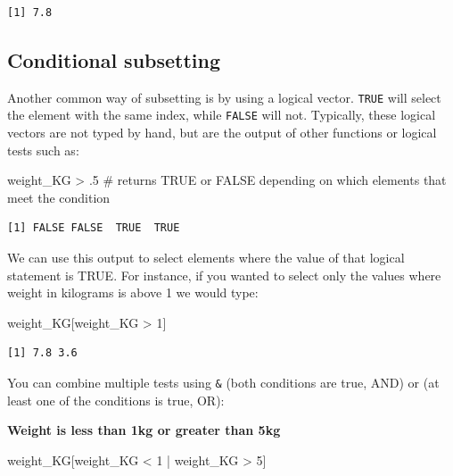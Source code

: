 \documentclass[
  letterpaper,
  DIV=11,
  numbers=noendperiod,
  oneside]{scrreprt}
\newenvironment{Shaded}{\begin{snugshade}}{\end{snugshade}}
\newcommand{\CommentTok}[1]{\textcolor[rgb]{0.37,0.37,0.37}{#1}}
\newcommand{\DecValTok}[1]{\textcolor[rgb]{0.68,0.00,0.00}{#1}}
\newcommand{\NormalTok}[1]{\textcolor[rgb]{0.00,0.23,0.31}{#1}}
\newcommand{\SpecialCharTok}[1]{\textcolor[rgb]{0.37,0.37,0.37}{#1}}
\begin{document}
\begin{verbatim}
[1] 7.8
\end{verbatim}

\subsection{Conditional subsetting}\label{sec-cond_subset}

Another common way of subsetting is by using a logical vector.
\texttt{TRUE} will select the element with the same index, while
\texttt{FALSE} will not. Typically, these logical vectors are not typed
by hand, but are the output of other functions or logical tests such as:

\begin{Shaded}
\begin{Highlighting}[]
\NormalTok{weight\_KG }\SpecialCharTok{\textgreater{}}\NormalTok{ .}\DecValTok{5}  \CommentTok{\# returns TRUE or FALSE depending on which elements that meet the condition}
\end{Highlighting}
\end{Shaded}

\begin{verbatim}
[1] FALSE FALSE  TRUE  TRUE
\end{verbatim}

We can use this output to select elements where the value of that
logical statement is TRUE. For instance, if you wanted to select only
the values where weight in kilograms is above 1 we would type:

\begin{Shaded}
\begin{Highlighting}[]
\NormalTok{weight\_KG[weight\_KG }\SpecialCharTok{\textgreater{}} \DecValTok{1}\NormalTok{]}
\end{Highlighting}
\end{Shaded}

\begin{verbatim}
[1] 7.8 3.6
\end{verbatim}

You can combine multiple tests using \texttt{\&} (both conditions are
true, AND) or \texttt{\textbar{}} (at least one of the conditions is
true, OR):

\textbf{Weight is less than 1kg or greater than 5kg}

\begin{Shaded}
\begin{Highlighting}[]
\NormalTok{weight\_KG[weight\_KG }\SpecialCharTok{\textless{}} \DecValTok{1} \SpecialCharTok{|}\NormalTok{ weight\_KG }\SpecialCharTok{\textgreater{}} \DecValTok{5}\NormalTok{]}
\end{Highlighting}
\end{Shaded}
\end{document}
